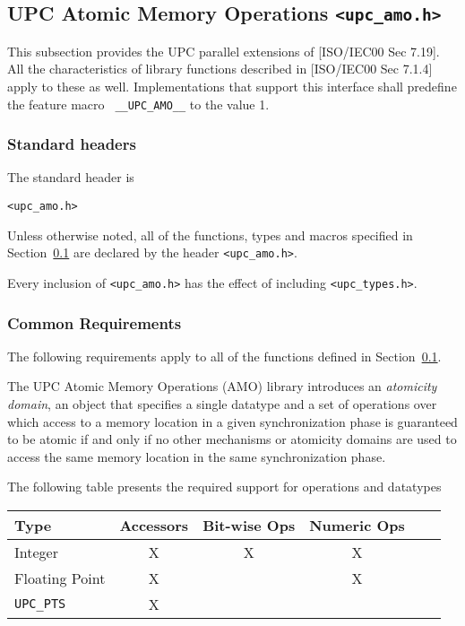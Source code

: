 \subsection{UPC Atomic Memory Operations {\tt <upc\_amo.h>}}
\label{upc-amo}

\npf This subsection provides the UPC parallel extensions of [ISO/IEC00 
    Sec 7.19].  All the characteristics of library functions described
    in [ISO/IEC00 Sec 7.1.4] apply to these as well.  Implementations
    that support this interface shall predefine the feature macro {\tt
    \_\_UPC\_AMO\_\_} to the value 1.

\subsubsection{Standard headers}

\np The standard header is

{\tt <upc\_amo.h>}

\np Unless otherwise noted, all of the functions, types and macros specified
    in Section~\ref{upc-amo} are declared by the header {\tt <upc\_amo.h>}.

\np Every inclusion of {\tt <upc\_amo.h>} has the effect of including
    {\tt <upc\_types.h>}.

\subsubsection{Common Requirements}
\label{upc-amo-reqs}
\npf The following requirements apply to all of the functions defined
     in Section~\ref{upc-amo}.

\np The UPC Atomic Memory Operations (AMO) library introduces an
    \emph{atomicity domain}, an object that specifies a single datatype and
    a set of operations over which access to a memory location in a given
    synchronization phase is guaranteed to be atomic if and only if no other
    mechanisms or atomicity domains are used to access the same memory
    location in the same synchronization phase.

\np The following table presents the required support for operations and
    datatypes

\begin{center}
\begin{tabular}{l|ccccc}
Type           & Accessors & Bit-wise Ops & Numeric Ops \\ \hline
Integer        &  X        &  X           &  X          \\
Floating Point &  X        &              &  X          \\
{\tt UPC\_PTS} &  X        &              &             \\
\end{tabular}
\end{center}

